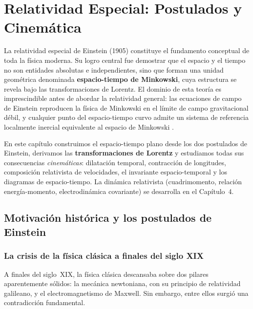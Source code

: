 
\chapter{Relatividad Especial: Postulados y Cinemática}
\label{cap:re_cinematica}

La relatividad especial de Einstein (1905) constituye el fundamento conceptual de toda la física moderna. Su logro central fue demostrar que el espacio y el tiempo no son entidades absolutas e independientes, sino que forman una unidad geométrica denominada \textbf{espacio-tiempo de Minkowski}, cuya estructura se revela bajo las transformaciones de Lorentz. El dominio de esta teoría es imprescindible antes de abordar la relatividad general: las ecuaciones de campo de Einstein reproducen la física de Minkowski en el límite de campo gravitacional débil, y cualquier punto del espacio-tiempo curvo admite un sistema de referencia localmente inercial equivalente al espacio de Minkowski \cite{Carroll2004, Schutz2009, Misner1973, Einstein1905}.

En este capítulo construimos el espacio-tiempo plano desde los dos postulados de Einstein, derivamos las \textbf{transformaciones de Lorentz} y estudiamos todas sus consecuencias \emph{cinemáticas}: dilatación temporal, contracción de longitudes, composición relativista de velocidades, el invariante espacio-temporal y los diagramas de espacio-tiempo. La dinámica relativista (cuadrimomento, relación energía-momento, electrodinámica covariante) se desarrolla en el Capítulo~4.

\section{Motivación histórica y los postulados de Einstein}

\subsection{La crisis de la física clásica a finales del siglo XIX}

A finales del siglo~XIX, la física clásica descansaba sobre dos pilares aparentemente sólidos: la mecánica newtoniana, con su principio de relatividad galileano, y el electromagnetismo de Maxwell. Sin embargo, entre ellos surgió una contradicción fundamental.

